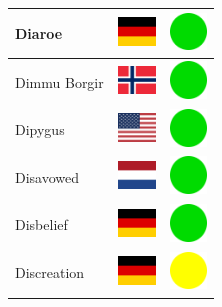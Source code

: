 \documentclass[12pt, a4paper, twoside]{report}
\begin{document}
\begin{center}
\begin{longtable}{|p{5cm}|p{2cm}|p{2cm}|}
 Diaroe                                                     & \includegraphics[width=1cm]{../img/flags/de} &   \includegraphics[width=1cm]{../likes/y} \\ \hline
 Dimmu Borgir                                               & \includegraphics[width=1cm]{../img/flags/no} &   \includegraphics[width=1cm]{../likes/y} \\ \hline
 Dipygus                                                    & \includegraphics[width=1cm]{../img/flags/us} &   \includegraphics[width=1cm]{../likes/y} \\ \hline
 Disavowed                                                  & \includegraphics[width=1cm]{../img/flags/nl} &   \includegraphics[width=1cm]{../likes/y} \\ \hline
 Disbelief                                                  & \includegraphics[width=1cm]{../img/flags/de} &   \includegraphics[width=1cm]{../likes/y} \\ \hline
 Discreation                                                & \includegraphics[width=1cm]{../img/flags/de} &   \includegraphics[width=1cm]{../likes/m} \\ \hline

\end{longtable}
\end{center}
\end{document}
